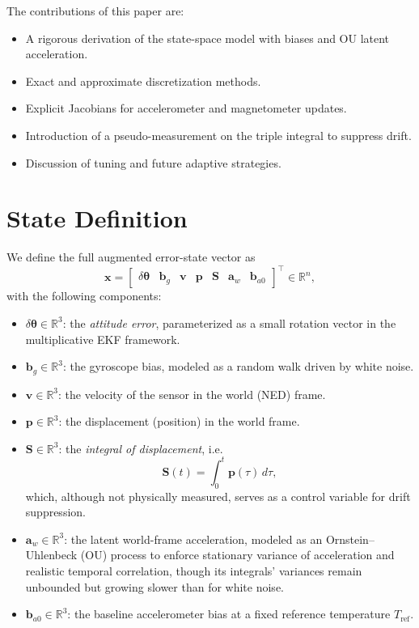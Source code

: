 \documentclass[10pt]{extarticle}
\begin{document}
The contributions of this paper are:
\begin{itemize}
\item A rigorous derivation of the state-space model with biases and OU latent acceleration.
\item Exact and approximate discretization methods.
\item Explicit Jacobians for accelerometer and magnetometer updates.
\item Introduction of a pseudo-measurement on the triple integral to suppress drift.
\item Discussion of tuning and future adaptive strategies.
\end{itemize}

\section{State Definition}

We define the full augmented error-state vector as
\begin{equation}
\bm{x} =
\begin{bmatrix}
\delta\bm\theta & \bm b_g & \bm v & \bm p & \bm S & \bm a_w & \bm b_{a0}
\end{bmatrix}^\top \in \mathbb{R}^n,
\label{eq:state_vector}
\end{equation}
with the following components:
\begin{itemize}
\item $\delta\bm\theta \in \mathbb{R}^3$: the \emph{attitude error}, parameterized as a small rotation vector in the multiplicative EKF framework.
\item $\bm b_g \in \mathbb{R}^3$: the gyroscope bias, modeled as a random walk driven by white noise.
\item $\bm v \in \mathbb{R}^3$: the velocity of the sensor in the world (NED) frame.
\item $\bm p \in \mathbb{R}^3$: the displacement (position) in the world frame.
\item $\bm S \in \mathbb{R}^3$: the \emph{integral of displacement}, i.e.
  \[
  \bm S(t) = \int_0^t \bm p(\tau)\, d\tau,
  \]
  which, although not physically measured, serves as a control variable for drift suppression.
\item $\bm a_w \in \mathbb{R}^3$: the latent world-frame acceleration, modeled as an Ornstein--Uhlenbeck (OU) process to enforce stationary variance of acceleration and realistic temporal correlation, though its integrals' variances remain unbounded but growing slower than for white noise.
\item $\bm b_{a0} \in \mathbb{R}^3$: the baseline accelerometer bias at a fixed reference temperature $T_\text{ref}$.
\end{itemize}
\end{document}
